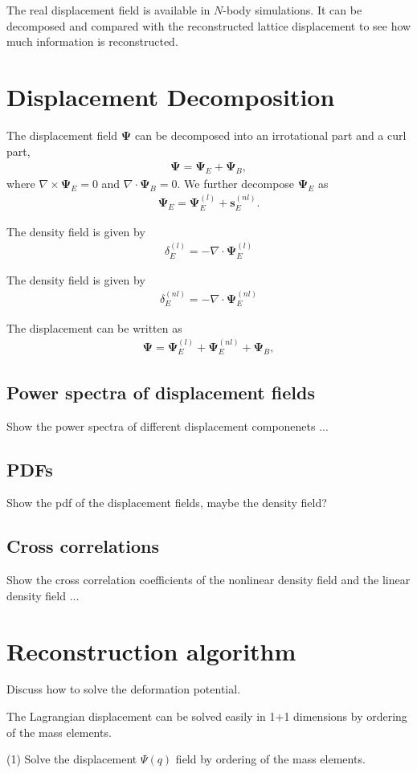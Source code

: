 \documentclass[aps,prd,twocolumn,showpacs,superscriptaddress,groupedaddress,nofootinbib]{revtex4}  %
\newcommand{\bea}{\begin{eqnarray}}
\newcommand{\eea}{\end{eqnarray}}
\newcommand{\bmp}{\bm{\Psi}}
\newcommand{\bms}{\bm{s}}
\begin{document}
The real displacement field is available in $N$-body simulations. It can be
decomposed and compared with the reconstructed lattice displacement to see
how much information is reconstructed. 

\section{Displacement Decomposition}
The displacement field $\bmp$ can be decomposed into an irrotational part and
a curl part,
\bea
\bm{\Psi}=\bm{\Psi}_E+\bm{\Psi}_B,
\eea
where $\nabla\times\bm{\Psi}_E=0$ and $\nabla\cdot\bm{\Psi}_B=0$. 
We further decompose $\bmp_E$ as
\bea
\bmp_E=\bmp_E^{(l)}+\bms_E^{(nl)}.
\eea

The density field is given by
\bea
\delta_E^{(l)}=-\nabla\cdot\bmp_E^{(l)}
\eea

The density field is given by
\bea
\delta_E^{(nl)}=-\nabla\cdot\bmp_E^{(nl)}
\eea


The displacement can be written as
\bea
\bm{\Psi}=\bm{\Psi}_E^{(l)}+\bm{\Psi}_E^{(nl)}+\bm{\Psi}_B,
\eea


\subsection{Power spectra of displacement fields}
Show the power spectra of different displacement componenets ...


\subsection{PDFs}
Show the pdf of the displacement fields, maybe the density field?


\subsection{Cross correlations}
Show the cross correlation coefficients of the nonlinear density field and 
the linear density field ...



\section{Reconstruction algorithm}
Discuss how to solve the deformation potential.

The Lagrangian displacement can be solved
easily in 1+1 dimensions by ordering of the mass elements.

(1) Solve the displacement $\Psi(q)$ field by ordering of the mass elements.
\end{document}
